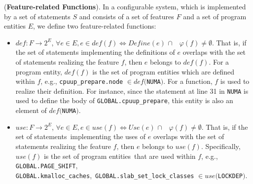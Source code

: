 \begin{Definition}{({\bf Feature-related Functions}).}
In a configurable system, which is implemented by a set of statements 
$S$ and consists of a set of features $F$ and a set of program 
entities $E$, we define two feature-related functions:
\begin{itemize}
	\item $def:F \to 2^E$, $\forall e \in E, e \in def(f) 
	  \Leftrightarrow 	Define(e) $ $\cap \quad \varphi(f) \neq \emptyset$. That is, if the set of statements implementing the definitions of $e$ overlaps with the set of statements realizing the feature $f$, then $e$ belongs to $def(f)$.
          For a program entity, $def(f)$ is the set of program entities which are defined within 
	$f$, e.g., \texttt{cpuup\_prepare.node} $\in def($\texttt{NUMA}$)$.
	For a function, $f$ is used to realize their definition. For instance, since the statement at line 31 in \texttt{NUMA} is used to define the body of \texttt{GLOBAL.cpuup\_prepare}, this entity is also an element of $def($\texttt{NUMA}$)$.

	\item $use:F \to 2^E$, $\forall e \in E, e \in use(f)
          \Leftrightarrow Use(e) $ $\cap \quad \varphi(f) \neq
          \emptyset$.  That is, if the set of statements~implementing
          the uses of $e$ overlaps with the set of statements realizing the feature $f$, then $e$ belongs to $use(f)$.
	Specifically, $use(f)$ is the set of program entities~that are used within $f$, 
	e.g., \texttt{GLOBAL.PAGE\_SHIFT}, \texttt{GLOBAL.kmalloc\_cach\-es},~\texttt{GLOBAL.slab\_set\_lock\_classes} $\in use($\texttt{LOCKDEP}$)$.
	
\end{itemize}
\end{Definition}
%
%

